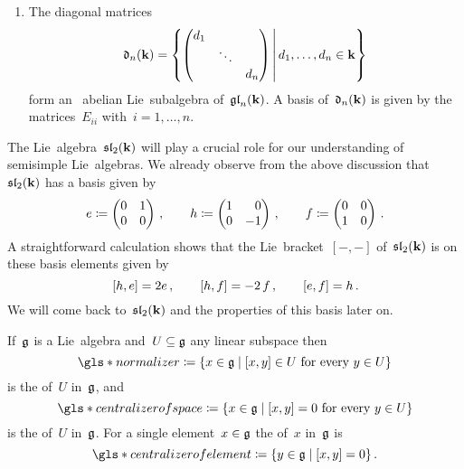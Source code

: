 \begin{examples}
\begin{enumerate}
    \item
      The diagonal matrices
      \[
        \dlie_n(\kf)
        =
        \left\{
          \begin{pmatrix}
              d_1
            & {}
            & {}
            \\
              {}
            & \ddots
            & {}
            \\
              {}
            & {}
            & d_n
          \end{pmatrix}
        \suchthat*
          d_1, \dotsc, d_n \in \kf
        \right\}
      \]
      form an~{} abelian Lie~subalgebra of~$\mathfrak{gl}_n(\mathbf{k})$.
      A basis of~$\mathfrak{d}_n(\mathbf{k})$ is given by the matrices~$E_{ii}$ with~$i = 1, \dotsc, n$.
  \end{enumerate}
\end{examples}


\begin{remark}
  The Lie~algebra~$\mathfrak{sl}_2(\mathbf{k})$ will play a crucial role for our understanding of semisimple Lie~algebras.
  We already observe from the above discussion that~$\mathfrak{sl}_2(\mathbf{k})$ has a basis given by
  \[
    e
    \defined
    \begin{pmatrix}
      0 & 1 \\
      0 & 0
    \end{pmatrix} \,,
    \qquad
    h
    \defined
    \begin{pmatrix*}[r]
      1 &  0  \\
      0 & -1
    \end{pmatrix*}  \,,
    \qquad
    f
    \defined
    \begin{pmatrix}
      0 & 0 \\
      1 & 0
    \end{pmatrix} \,.
  \]
  A straightforward calculation shows that the Lie~bracket~$[-,-]$ of~$\mathfrak{sl}_2(\mathbf{k})$ is on these basis elements given by
  \[
    [h, e]
    =
    2e  \,,
    \qquad
    [h, f]
    =
    -2 \, f \,,
    \qquad
    [e,f]
    =
    h \,.
  \]
  We will come back to~$\mathfrak{sl}_2(\mathbf{k})$ and the properties of this basis later on.
\end{remark}


\begin{definition}
  If~$\mathfrak{g}$ is a Lie~algebra and~$U \subseteq \mathfrak{g}$ any linear subspace then
  \[
    \gls*{normalizer}
    \defined
    \{
      x \in \glie
    \suchthat
      \text{$[x,y] \in U$ for every~$y \in U$}
    \}
  \]
  is the  of~$U$ in~$\mathfrak{g}$, and
  \[
    \gls*{centralizer of space}
    \defined
    \{
      x \in \glie
    \suchthat
      \text{$[x,y] = 0$ for every~$y \in U$}
    \}
  \]
  is the  of~$U$ in~$\mathfrak{g}$.
  For a single element~$x \in \mathfrak{g}$ the  of~$x$ in~$\mathfrak{g}$ is
  \[
    \gls*{centralizer of element}
    \defined
    \{
      y \in \glie
    \suchthat
      [x,y] = 0
    \} \,.
  \]
\end{definition}


